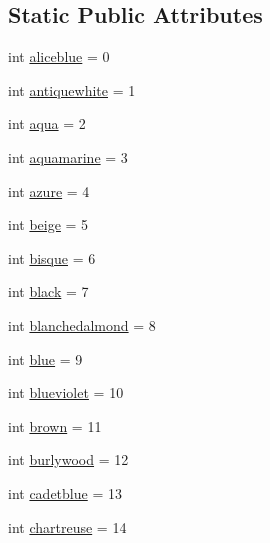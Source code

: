 \subsection*{Static Public Attributes}
\begin{DoxyCompactItemize}
\item 
int \mbox{\hyperlink{classbridges_1_1named__color_1_1_named_color_aee5ed43983f4942acabae2cb74b9c6fd}{aliceblue}} = 0
\item 
int \mbox{\hyperlink{classbridges_1_1named__color_1_1_named_color_a095e0f1c39cca4646342de08f3e2ae08}{antiquewhite}} = 1
\item 
int \mbox{\hyperlink{classbridges_1_1named__color_1_1_named_color_a5b0169dcaba9e476f8e27661a2f8bac2}{aqua}} = 2
\item 
int \mbox{\hyperlink{classbridges_1_1named__color_1_1_named_color_af1ac4e74031b4fd05b57163d563a9203}{aquamarine}} = 3
\item 
int \mbox{\hyperlink{classbridges_1_1named__color_1_1_named_color_a470c7fda14d73fcc3e5e88173f16b61f}{azure}} = 4
\item 
int \mbox{\hyperlink{classbridges_1_1named__color_1_1_named_color_a194e86fe8f9bb60027e034ee154b183d}{beige}} = 5
\item 
int \mbox{\hyperlink{classbridges_1_1named__color_1_1_named_color_a5d6d95062328c5239deb5ec3468c3ae8}{bisque}} = 6
\item 
int \mbox{\hyperlink{classbridges_1_1named__color_1_1_named_color_a2edeb90cbdc17f3dc55f408860c24485}{black}} = 7
\item 
int \mbox{\hyperlink{classbridges_1_1named__color_1_1_named_color_afbfe28e04e02ad5a4ec8db9da002c8b0}{blanchedalmond}} = 8
\item 
int \mbox{\hyperlink{classbridges_1_1named__color_1_1_named_color_a145708a26f3f348fb34085de800c6e67}{blue}} = 9
\item 
int \mbox{\hyperlink{classbridges_1_1named__color_1_1_named_color_aa1705830246a072daff144dba5057c50}{blueviolet}} = 10
\item 
int \mbox{\hyperlink{classbridges_1_1named__color_1_1_named_color_aa3978a16dd98160a2aeebcc80fe63ce2}{brown}} = 11
\item 
int \mbox{\hyperlink{classbridges_1_1named__color_1_1_named_color_aa7c0175b0d2cf1520f533756b751ff7a}{burlywood}} = 12
\item 
int \mbox{\hyperlink{classbridges_1_1named__color_1_1_named_color_ae1f7eeec56380825f5af324ee7c24352}{cadetblue}} = 13
\item 
int \mbox{\hyperlink{classbridges_1_1named__color_1_1_named_color_a1c0ea1996bcc7315e1b18d35bb4266bb}{chartreuse}} = 14

\end{DoxyCompactItemize}
